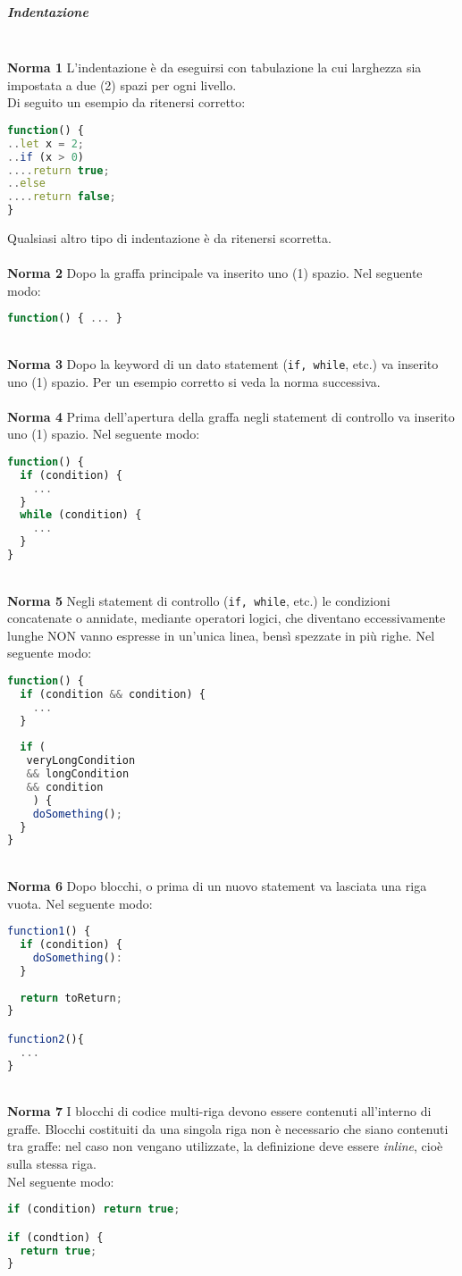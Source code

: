 \subparagraph{Indentazione}\-\\
\textbf{Norma 1}
L'indentazione è da eseguirsi con tabulazione la cui larghezza sia impostata a due (2) spazi per ogni livello.\\
Di seguito un esempio da ritenersi corretto:
\begin{lstlisting}[language=JavaScript]
function() {
..let x = 2;
..if (x > 0)
....return true;
..else
....return false;
}
\end{lstlisting}
Qualsiasi altro tipo di indentazione è da ritenersi scorretta.\\
\-\\
\textbf{Norma 2}
Dopo la graffa principale va inserito uno (1) spazio. Nel seguente modo:
\begin{lstlisting}[language=JavaScript]
function() { ... }
\end{lstlisting}
\-\\
\textbf{Norma 3}
Dopo la keyword di un dato statement (\texttt{if, while}, etc.) va inserito uno (1) spazio. Per un esempio corretto si veda la norma successiva.\\
\-\\
\textbf{Norma 4}
Prima dell'apertura della graffa negli statement di controllo va inserito uno (1) spazio. Nel seguente modo:
\begin{lstlisting}[language=JavaScript]
function() {
  if (condition) {
    ...  
  }
  while (condition) {
    ...
  }
}
\end{lstlisting}
\-\\
\textbf{Norma 5}
Negli statement di controllo (\texttt{if, while}, etc.) le condizioni concatenate o annidate, mediante operatori logici, che diventano eccessivamente lunghe NON vanno espresse in un'unica linea, bensì spezzate in più righe. Nel seguente modo:
\begin{lstlisting}[language=JavaScript]
function() {
  if (condition && condition) {
    ...  
  }
  
  if (
   veryLongCondition
   && longCondition
   && condition
    ) {
    doSomething();
  }
}
\end{lstlisting}
\-\\
\textbf{Norma 6}
Dopo blocchi, o prima di un nuovo statement va lasciata una riga vuota. Nel seguente modo:
\begin{lstlisting}[language=JavaScript]
function1() {
  if (condition) {
    doSomething():  
  }
  
  return toReturn;  
}

function2(){
  ...
}
\end{lstlisting}
\-\\
\textbf{Norma 7}
I blocchi di codice multi-riga devono essere contenuti all'interno di graffe. Blocchi costituiti da una singola riga non è necessario che siano contenuti tra graffe: nel caso non vengano utilizzate, la definizione deve essere \textit{inline}, cioè sulla stessa riga.\\
Nel seguente modo:
\begin{lstlisting}[language=JavaScript]
if (condition) return true;

if (condtion) {
  return true;
}
\end{lstlisting}

